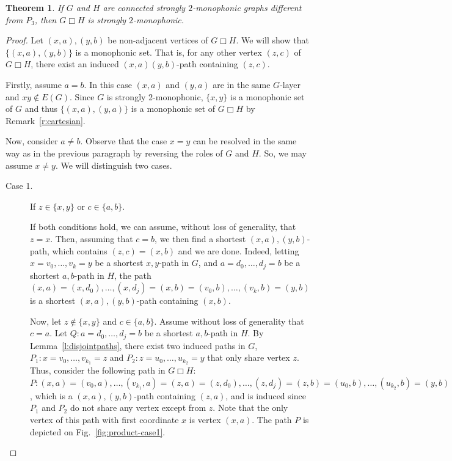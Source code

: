 \documentclass[a4paper,11pt]{article}
\newtheorem{theorem}{Theorem}
\begin{document}
\begin{theorem}\label{thm:product}
    If $G$ and $H$ are connected strongly $2$-monophonic graphs different from $P_3$, then $G\Box H$ is strongly $2$-monophonic.
\end{theorem}
\begin{proof}
    Let $(x,a),(y,b)$ be non-adjacent vertices of $G\Box H$. We will show that $\{(x,a),(y,b)\}$ is a monophonic set.  That is, for any other vertex $(z,c)$ of $G\Box H$, there exist an induced $(x,a)(y,b)$-path containing $(z,c)$.

    Firstly, assume $a=b$. In this case $(x,a)$ and $(y,a)$ are in the same $G$-layer and $xy\notin E(G)$. Since $G$ is strongly 2-monophonic, $\{x,y\}$ is a monophonic set of $G$ and thus $\{(x,a),(y,a)\}$ is a monophonic set of $G \Box H$ by Remark~\ref{r:cartesian}. 

    Now, consider $a\neq b$. Observe that the case $x=y$ can be resolved in the same way as in the previous paragraph by reversing the roles of $G$ and $H$. So, we may assume $x\neq y$.
    We will distinguish two cases.

    \begin{description}
        \item[Case 1.] If $z\in \{x,y\}$ or $c\in \{a,b\}$. 

        If both conditions hold, we can assume, without loss of generality, that $z=x$. Then, assuming that $c=b$, we then find a shortest $(x,a),(y,b)$-path, which contains $(z,c)=(x,b)$ and we are done. Indeed, letting $x=v_0,\ldots, v_k=y$ be a shortest $x,y$-path in $G$, and $a=d_0,\ldots,d_j=b$ be a shortest $a,b$-path in $H$, the path $(x,a)=(x,d_0),\ldots,(x,d_j)=(x,b)=(v_0,b),\ldots,(v_k,b)=(y,b)$ is a shortest $(x,a),(y,b)$-path containing $(x,b)$.

        Now, let $z\notin\{x,y\}$ and $c\in \{a,b\}$. Assume without loss of generality that $c=a$. Let $Q:a=d_0,\ldots,d_j=b$ be a shortest $a,b$-path in $H$. 
        By Lemma~\ref{l:disjointpaths}, there exist two induced paths in $G$, $P_1:x=v_0,\ldots,v_{k_1}=z$ and $P_2:z=u_0,\ldots,u_{k_2}=y$ that only share vertex $z$. Thus, consider the following path in $G\Box H$: $P:(x,a)=(v_0,a),\ldots,(v_{k_1},a)=(z,a)=(z,d_0),\ldots,(z,d_j)=(z,b)=(u_0,b),\ldots,(u_{k_2},b)=(y,b)$, which is a $(x,a),(y,b)$-path containing $(z,a)$, and is induced since $P_1$ and $P_2$ do not share any vertex except from $z$.
        Note that the only vertex of this path with first coordinate $x$ is vertex $(x,a)$. The path $P$ is depicted on Fig.~\ref{fig:product-case1}.
        \begin{figure}[ht]
        \centering
\end{figure}
\end{description}
\end{proof}
\end{document}
